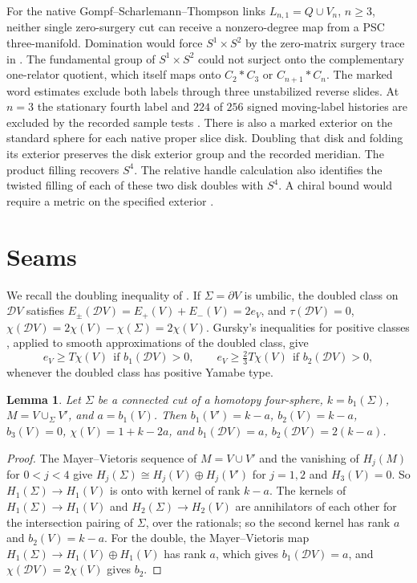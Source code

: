 \documentclass[11pt,letterpaper]{article}
\numberwithin{equation}{section}
\newtheorem{lemma}[theorem]{Lemma}
\theoremstyle{definition}
\newcommand{\cD}{\mathcal D}
\begin{document}
For the native Gompf--Scharlemann--Thompson links
\(L_{n,1}=Q\cup V_n\), \(n\ge3\), neither single zero-surgery cut can
receive a nonzero-degree map from a PSC three-manifold. Domination
would force \(S^1\times S^2\) by the zero-matrix surgery trace in
\cite{Baker2026HandleCuts}. The fundamental group of \(S^1\times S^2\) could not surject onto
the complementary one-relator quotient, which itself maps onto
\(C_2*C_3\) or \(C_{n+1}*C_n\). The marked word estimates exclude
both labels through three unstabilized reverse slides. At \(n=3\)
the stationary fourth label and \(224\) of \(256\) signed moving-label
histories are excluded by the recorded sample tests
\cite[SLIDE, cut certificates]{Baker2026MarkedCutCalculations}.
There is also a marked exterior on the standard sphere for each native
proper slice disk. Doubling that disk and folding its exterior preserves
the disk exterior group and the recorded meridian. The product filling
recovers \(S^4\). The relative handle calculation also identifies
the twisted filling of each of these two disk doubles with \(S^4\).
A chiral bound would require a metric on the specified exterior
\cite[SLIDE, native disk doubles]{Baker2026MarkedCutCalculations}.

\section{Seams}\label{sec:seams}

We recall the doubling inequality of \cite{Baker2026ChiralMaster}. If
\(\Sigma=\partial V\) is umbilic, the doubled class on \(\cD V\) satisfies
\(E_\pm(\cD V)=E_+(V)+E_-(V)=2e_V\), and \(\tau(\cD V)=0\),
\(\chi(\cD V)=2\chi(V)-\chi(\Sigma)=2\chi(V)\). Gursky's inequalities for
positive classes \cite{Gursky1998WeylFunctional,Sung2021Weyl}, applied to smooth
approximations of the doubled class, give
\begin{equation}\label{eq:doubling}
 e_V\ge T\chi(V)\ \ \text{if } b_1(\cD V)>0,\qquad
 e_V\ge\tfrac23T\chi(V)\ \ \text{if } b_2(\cD V)>0,
\end{equation}
whenever the doubled class has positive Yamabe type.

\begin{lemma}\label{lem:homology}
Let \(\Sigma\) be a connected cut of a homotopy four-sphere, \(k=b_1(\Sigma)\),
\(M=V\cup_\Sigma V'\), and \(a=b_1(V)\). Then \(b_1(V')=k-a\),
\(b_2(V)=k-a\), \(b_3(V)=0\), \(\chi(V)=1+k-2a\), and
\(b_1(\cD V)=a\), \(b_2(\cD V)=2(k-a)\).
\end{lemma}
\begin{proof}
The Mayer--Vietoris sequence of \(M=V\cup V'\) and the vanishing of
\(H_j(M)\) for \(0<j<4\) give \(H_j(\Sigma)\cong H_j(V)\oplus H_j(V')\)
for \(j=1,2\) and \(H_3(V)=0\). So \(H_1(\Sigma)\to H_1(V)\) is onto with
kernel of rank \(k-a\). The kernels of \(H_1(\Sigma)\to H_1(V)\) and
\(H_2(\Sigma)\to H_2(V)\) are annihilators of each other for the
intersection pairing of \(\Sigma\), over the rationals; so the second
kernel has rank \(a\) and \(b_2(V)=k-a\). For the double, the
Mayer--Vietoris map \(H_1(\Sigma)\to H_1(V)\oplus H_1(V)\) has rank \(a\),
which gives \(b_1(\cD V)=a\), and \(\chi(\cD V)=2\chi(V)\) gives \(b_2\).
\end{proof}
\end{document}
